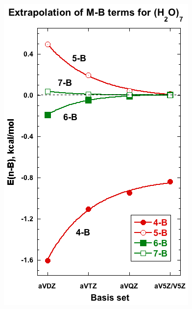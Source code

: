 \documentclass [11pt, proquest] {uwthesis}[2020/02/24]
\begin{document}
\begin{figure}[t]
\uwsinglespace
\begin{center}
\begin{minipage}{0.45\textwidth}
\includegraphics[width=.9\textwidth]{Figures/Chapter_2/MB_extrap_w7_noBSSE.jpg}
\end{minipage}
\begin{minipage}{0.45\textwidth}

\end{minipage}
\end{center}
\end{figure}
\end{document}
